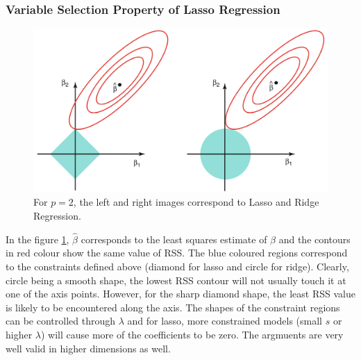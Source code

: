 \documentclass[11pt, a4paper]{article}
\begin{document}
    \subsubsection{Variable Selection Property of Lasso Regression}
    \begin{figure}[h]
    \includegraphics[scale=0.4]{lasso_contours}
    \centering
    \caption{For $p=2$, the left and right images correspond to Lasso and Ridge Regression.}
    \label{fig:lasso_contour} %
    \end{figure}

    In the figure \ref{fig:lasso_contour}, $\hat{\beta}$ corresponds to the least squares estimate of $\beta$ and the contours in red colour show the same value of RSS. The blue coloured regions correspond to the constraints defined above (diamond for lasso and circle for ridge).\newline
    Clearly, circle being a smooth shape, the lowest RSS contour will not usually touch it at one of the axis points. However, for the sharp diamond shape, the least RSS value is likely to be encountered along the axis. The shapes of the constraint regions can be controlled through $\lambda$ and for lasso, more constrained models (small $s$ or higher $\lambda$) will cause more of the coefficients to be zero. The argmuents are very well valid in higher dimensions as well.

    
\end{document}
